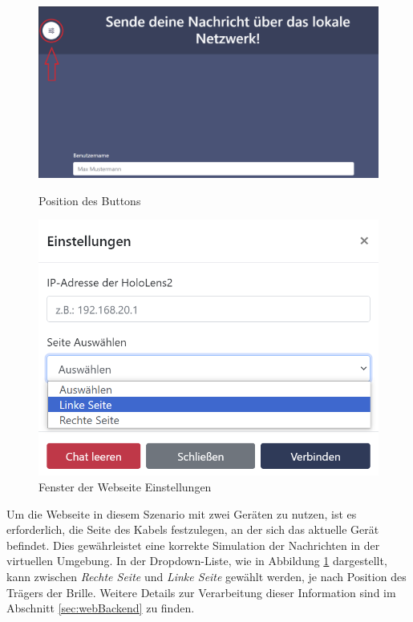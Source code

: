 \begin{figure}[H]
\centering
\begin{minipage}[b]{0.7\textwidth}
\centering
\includegraphics[width=\textwidth]{images/WebButton}
\caption{Position des Buttons}
\label{fig:webbut}
\end{minipage}
\hfill
\begin{minipage}[b]{0.4\textwidth}
\centering
\includegraphics[width=\textwidth]{images/WebseiteSettings}
\caption{Fenster der Webseite Einstellungen}
\label{fig:websettings}
\end{minipage}
\end{figure}

Um die Webseite in diesem Szenario mit zwei Geräten zu nutzen, ist es erforderlich, die Seite des Kabels festzulegen, an der sich das aktuelle Gerät befindet. Dies gewährleistet eine korrekte Simulation der Nachrichten in der virtuellen Umgebung. In der Dropdown-Liste, wie in Abbildung \ref{fig:websettings} dargestellt, kann zwischen \textit{Rechte Seite} und \textit{Linke Seite} gewählt werden, je nach Position des Trägers der Brille. Weitere Details zur Verarbeitung dieser Information sind im Abschnitt \ref{sec:webBackend} zu finden.

